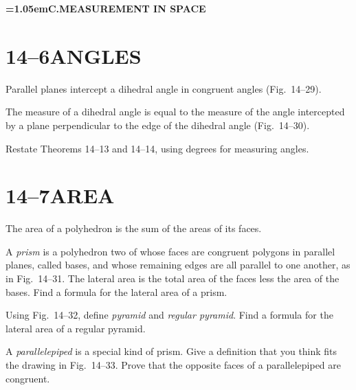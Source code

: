 \documentclass[11pt]{book}
\theoremstyle{bkplain}
\theoremstyle{XIplainnote}
\theoremstyle{bkplain}
\newcommand{\XIVpart}[1]{%
  \par\addvspace{1.5\baselineskip}\nopagebreak
  \begin{center}\bfseries\spaceskip=1.05em\relax #1\end{center}%
  \nopagebreak\addvspace{0.8\baselineskip}}
\theoremstyle{bkplain}
\begin{document}
\FIGXIVTWENTYEIGHT

\XIVpart{C.\quad MEASUREMENT IN SPACE}

\section*{14--6\quad ANGLES}

\begin{theorem}
Parallel planes intercept a dihedral angle in congruent angles (Fig.~14--29).
\end{theorem}

\begin{definition}
The measure of a dihedral angle is equal to the measure of the angle intercepted
by a plane perpendicular to the edge of the dihedral angle (Fig.~14--30).
\end{definition}

Restate Theorems 14--13 and 14--14, using degrees for measuring angles.

\FIGXIVTWENTYNINETHIRTY

\section*{14--7\quad AREA}

\begin{definition}
The area of a polyhedron is the sum of the areas of its faces.
\end{definition}

\begin{exercisecols}
\begin{exlist}
\item A \emph{prism} is a polyhedron two of whose faces are congruent polygons
      in parallel planes, called bases, and whose remaining edges are all
      parallel to one another, as in Fig.~14--31. The lateral area is the total
      area of the faces less the area of the bases. Find a formula for the
      lateral area of a prism.
\exfig{\FIGXIVTHIRTYONE}
\item Using Fig.~14--32, define \emph{pyramid} and \emph{regular pyramid}. Find
      a formula for the lateral area of a regular pyramid.
\exfig{\FIGXIVTHIRTYTWO}
\item A \emph{parallelepiped} is a special kind of prism. Give a definition that
      you think fits the drawing in Fig.~14--33. Prove that the opposite faces
      of a parallelepiped are congruent.
\exfig{\FIGXIVTHIRTYTHREE}
\end{exlist}
\end{exercisecols}
\end{document}
